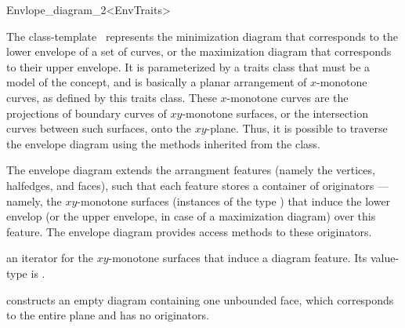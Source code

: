 
\ccRefPageBegin

\begin{ccRefClass}{Envlope_diagram_2<EnvTraits>}

\ccDefinition

The class-template \ccClassTemplateName\ represents the minimization
diagram that corresponds to the lower envelope of a set of curves, or the
maximization diagram that corresponds to their upper envelope. It is
parameterized by a traits class that must be a model of the
 concept, and is basically a planar arrangement of
$x$-monotone curves, as defined by this traits class. These $x$-monotone
curves are the projections of boundary curves of $xy$-monotone surfaces,
or the intersection curves between such surfaces, onto the $xy$-plane.
Thus, it is possible to traverse the envelope diagram using the
methods inherited from the  class.

The envelope diagram extends the arrangment features (namely the vertices,
halfedges, and faces), such that each feature stores a container of
originators --- namely, the $xy$-monotone surfaces (instances of the type
) that induce the lower envelop
(or the upper envelope, in case of a maximization diagram) over this
feature. The envelope diagram provides access methods to these originators.

 
\ccInheritsFrom

\ccTypes

\ccGlue
{}

{an iterator for the $xy$-monotone surfaces that induce a diagram feature.
 Its value-type is .}

\ccCreation
{}

    {constructs an empty diagram containing one unbounded face,
     which corresponds to the entire plane and has no originators.}
    

\end{ccRefClass}

